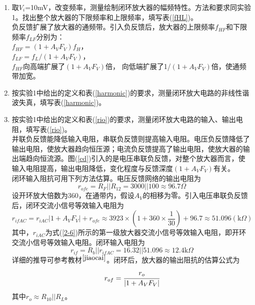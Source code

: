 \documentclass[a4paper]{article}
\begin{document}
\begin{enumerate}
\begin{enumerate}
\item 取$V_i$=10mV，改变频率，测量绘制闭环放大器的幅频特性。方法和要求同实验1。找出整个放大器的下限频率和上限频率，填写表(\ref{fHL})。\\
负反馈扩展了放大器的通频带。引入负反馈后，放大器的上限频率$f_{HF}$和下限频率$f_{LF}$分别为：\\
$f_{HF} = (1+A_VF_V)f_H$，\\
$f_{LF} = f_L/(1+A_VF_V)$，\\
$f_{HF}$向高端扩展了$(1+A_VF_V)$倍， 向低端扩展了1/$(1+A_VF_V)$倍，使通频带加宽。
\item 按实验1中给出的定义和表(\ref{harmonic})的要求，测量闭环放大电路的非线性谐波失真，填写表(\ref{harmonic})。
\item 按实验1中给出的定义和表(\ref{rio})的要求，测量闭环放大电路的输入、输出电阻，填写表(\ref{rio})。\\
并联负反馈能降低输入电阻，串联负反馈则提高输入电阻。电压负反馈降低了输出电阻，使放大器趋向恒压源；电流负反馈提高了输出电阻，使放大器的输出端趋向恒流源。图(\ref{cd})引入的是电压串联负反馈，对整个放大器而言，使输入电阻提高，输出电阻降低，变化程度与反馈深度$(1+A_VF_V)$有关。\\
闭环输入阻抗可用下列方法估算。电压反馈网络的输出电阻为
\begin{equation}
r_{ofe} = R_F||R_{12} = 3000||100 \approx 96.7\Omega
\end{equation}
设开环放大倍数为360，在通带内，假设$A_V$的相移为零。引入电压串联负反馈后，闭环交流小信号等效输入电阻为
\begin{equation}
r_{ifAC} = r_{iAC}|1+A_VF_V|+r_{ofe}
 \approx 3923\times (1+360\times\frac{1}{30})+96.7
  \approx 51.096(\text{k}\Omega)
\end{equation}
其中，$r_{iAC}$为式(\ref{2-6})所示的第一级放大器交流小信号等效输入电阻，即开环交流小信号等效输入电阻。闭环输入电阻为
\begin{equation}
r_{if} = R_b||r_{ifAC} = 16.32||51.096 \approx 12.4\text{k}\Omega
\end{equation}
详细的推导可参考教材$^{\cite{jiaocai}}$。闭环后，放大器的输出阻抗的估算公式为
\begin{equation}
r_{of} = \cfrac{r_o}{|1+A_VF_V|}
\end{equation}
其中$r_o \approx R_{10}||R_L$。
\end{enumerate}
\end{enumerate}

\end{document}
